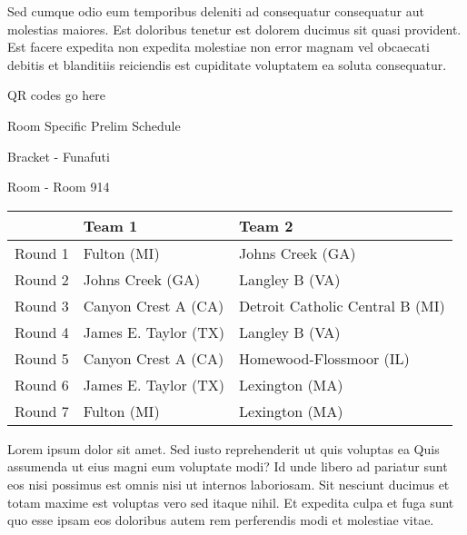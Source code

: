 \documentclass{article}%
\begin{document}
\newline%
Sed cumque odio eum temporibus deleniti ad consequatur consequatur aut molestias maiores. Est doloribus tenetur est dolorem ducimus sit quasi provident. Est facere expedita non expedita molestiae non error magnam vel obcaecati debitis et blanditiis reiciendis est cupiditate voluptatem ea soluta consequatur.%
\vspace*{140pt}%
\begin{center}%
\begin{Huge}%
QR codes go here%
\end{Huge}%
\end{center}%
\newpage%
\begin{center}%
\begin{Huge}%
Room Specific Prelim Schedule%
\end{Huge}%
\vspace*{8pt}%
\linebreak%
\begin{Large}%
Bracket {-} Funafuti%
\end{Large}%
\vspace*{8pt}%
\linebreak%
\vspace*{8pt}%
\begin{Large}%
Room {-} Room 914%
\end{Large}%
\end{center}%
%
\begin{tabularx}{\textwidth}{|c|Y|Y|}%
\hline%
&Team 1&Team 2\\%
\hline%
Round 1&Fulton (MI)&Johns Creek (GA)\\%
Round 2&Johns Creek (GA)&Langley B (VA)\\%
Round 3&Canyon Crest A (CA)&Detroit Catholic Central B (MI)\\%
Round 4&James E. Taylor (TX)&Langley B (VA)\\%
Round 5&Canyon Crest A (CA)&Homewood{-}Flossmoor (IL)\\%
Round 6&James E. Taylor (TX)&Lexington (MA)\\%
Round 7&Fulton (MI)&Lexington (MA)\\%
\hline%
\end{tabularx}%
\vspace*{8pt}%
\newline%
Lorem ipsum dolor sit amet. Sed iusto reprehenderit ut quis voluptas ea Quis assumenda ut eius magni eum voluptate modi? Id unde libero ad pariatur sunt eos nisi possimus est omnis nisi ut internos laboriosam. Sit nesciunt ducimus et totam maxime est voluptas vero sed itaque nihil. Et expedita culpa et fuga sunt quo esse ipsam eos doloribus autem rem perferendis modi et molestiae vitae.\newline%
\end{document}

